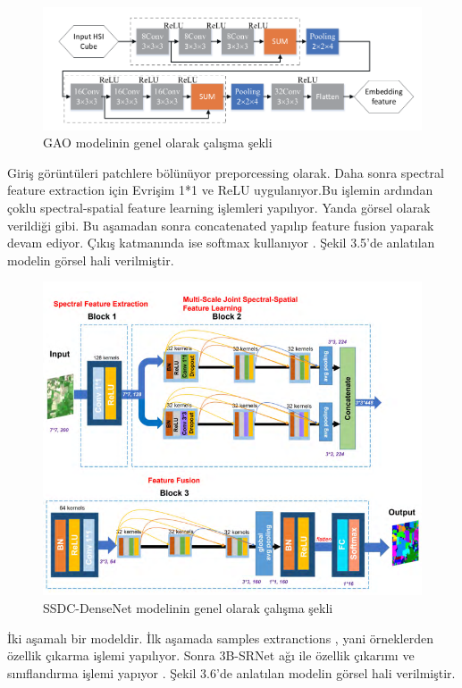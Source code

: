\begin{figure}[!ht]
  \centering
  \includegraphics[width=1\textwidth]{Figures/gao16.png}
  \caption{GAO modelinin genel olarak çalışma şekli }
\end{figure}
\newpage
Giriş görüntüleri patchlere bölünüyor preporcessing olarak. Daha sonra spectral feature extraction için Evrişim 1*1 ve ReLU uygulanıyor.Bu işlemin ardından çoklu spectral-spatial feature learning işlemleri yapılıyor. Yanda görsel olarak verildiği gibi. Bu aşamadan sonra concatenated yapılıp feature fusion yaparak devam ediyor. Çıkış katmanında ise softmax kullanıyor \cite{bai2019ssdc}. Şekil 3.5'de anlatılan modelin görsel hali verilmiştir. \\

\begin{figure}[!ht]
  \centering
  \includegraphics[width=1\textwidth]{Figures/ssfl17.png}
  \caption{SSDC-DenseNet modelinin genel olarak çalışma şekli }
\end{figure}

\newpage
İki aşamalı bir modeldir. İlk aşamada samples extranctions , yani örneklerden özellik çıkarma işlemi yapılıyor. Sonra 3B-SRNet  ağı ile özellik çıkarımı ve sınıflandırma işlemi yapıyor \cite{jiang2019hyperspectral}. Şekil 3.6'de anlatılan modelin görsel hali verilmiştir. \\

